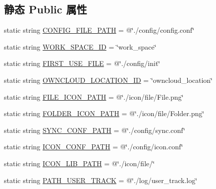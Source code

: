 \subsection*{静态 Public 属性}
\begin{DoxyCompactItemize}
\item 
static string \hyperlink{classcustom__cloud_1_1_my_config_a921b365b01b5b5b3f05924857d063a30}{C\+O\+N\+F\+I\+G\+\_\+\+F\+I\+L\+E\+\_\+\+P\+A\+TH} = @\char`\"{}./config/config.\+conf\char`\"{}
\item 
static string \hyperlink{classcustom__cloud_1_1_my_config_ad40261abf88868750cb447be22763a39}{W\+O\+R\+K\+\_\+\+S\+P\+A\+C\+E\+\_\+\+ID} = \char`\"{}work\+\_\+space\char`\"{}
\item 
static string \hyperlink{classcustom__cloud_1_1_my_config_a891dc46b237c247c7a1abd32ef6aa80c}{F\+I\+R\+S\+T\+\_\+\+U\+S\+E\+\_\+\+F\+I\+LE} = @\char`\"{}./config/init\char`\"{}
\item 
static string \hyperlink{classcustom__cloud_1_1_my_config_ad7ae95c67e2c24408e9378bb3ec7b7d4}{O\+W\+N\+C\+L\+O\+U\+D\+\_\+\+L\+O\+C\+A\+T\+I\+O\+N\+\_\+\+ID} = \char`\"{}owncloud\+\_\+location\char`\"{}
\item 
static string \hyperlink{classcustom__cloud_1_1_my_config_ad69521d730067e24ebba5a63e64ce894}{F\+I\+L\+E\+\_\+\+I\+C\+O\+N\+\_\+\+P\+A\+TH} = @\char`\"{}./icon/file/File.\+png\char`\"{}
\item 
static string \hyperlink{classcustom__cloud_1_1_my_config_a33daf2a59d1aa83c6962cb06c5df3398}{F\+O\+L\+D\+E\+R\+\_\+\+I\+C\+O\+N\+\_\+\+P\+A\+TH} = @\char`\"{}./icon/file/Folder.\+png\char`\"{}
\item 
static string \hyperlink{classcustom__cloud_1_1_my_config_a265d6dfcd394817323163a2f622752a0}{S\+Y\+N\+C\+\_\+\+C\+O\+N\+F\+\_\+\+P\+A\+TH} = @\char`\"{}./config/sync.\+conf\char`\"{}
\item 
static string \hyperlink{classcustom__cloud_1_1_my_config_a8060e751738dd94c17d75a41210a6971}{I\+C\+O\+N\+\_\+\+C\+O\+N\+F\+\_\+\+P\+A\+TH} = @\char`\"{}./config/icon.\+conf\char`\"{}
\item 
static string \hyperlink{classcustom__cloud_1_1_my_config_a9fcfd2020d53f5d13398c5d385471778}{I\+C\+O\+N\+\_\+\+L\+I\+B\+\_\+\+P\+A\+TH} = @\char`\"{}./icon/file/\char`\"{}
\item 
static string \hyperlink{classcustom__cloud_1_1_my_config_aca4a0fa821cb0d9bc77765e276a15b16}{P\+A\+T\+H\+\_\+\+U\+S\+E\+R\+\_\+\+T\+R\+A\+CK} = @\char`\"{}./log/user\+\_\+track.\+log\char`\"{}
\item 

\end{DoxyCompactItemize}
